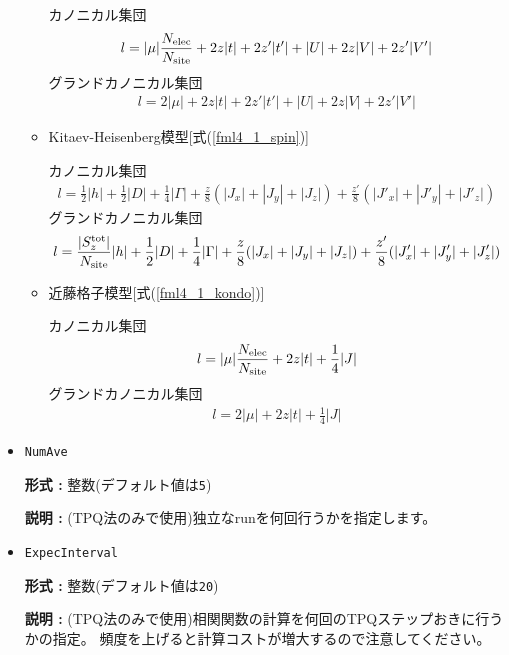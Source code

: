 \begin{itemize}
\begin{itemize}
カノニカル集団
\begin{align}
l = |\mu| \frac{N_{\rm elec}}{N_{\rm site}}
+ 2 z |t| + 2 z' |t'| + |U| + 2 z |V| + 2 z' |V'| 
\end{align}
グランドカノニカル集団
\begin{align}
l = 2|\mu|
+ 2 z |t| + 2 z' |t'| + |U| + 2 z |V| + 2 z' |V'|
\end{align}

\item Kitaev-Heisenberg模型[式(\ref{fml4_1_spin})]

カノニカル集団
\begin{align}
l = \frac{1}{2}|h| + \frac{1}{2}|D| + \frac{1}{4}|\Gamma|
+\frac{z}{8} (|J_x|+|J_y|+|J_z|) +\frac{z'}{8} (|J'_x|+|J'_y|+|J'_z|) 
\end{align}
グランドカノニカル集団
\begin{align}
l = \frac{|S_z^{\rm tot}|}{N_{\rm site}}|h| + \frac{1}{2}|D| + \frac{1}{4}|\Gamma|
+\frac{z}{8} (|J_x|+|J_y|+|J_z|) +\frac{z'}{8} (|J'_x|+|J'_y|+|J'_z|)
\end{align}

\item 近藤格子模型[式(\ref{fml4_1_kondo})]

カノニカル集団
\begin{align}
l = |\mu| \frac{N_{\rm elec}}{N_{\rm site}} + 2 z |t| + \frac{1}{4} |J| 
\end{align}
グランドカノニカル集団
\begin{align}
l = 2|\mu| + 2 z |t| + \frac{1}{4} |J| 
\end{align}

\end{itemize}

\item \verb|NumAve|

{\bf 形式 :} 整数(デフォルト値は\verb|5|)

{\bf 説明 :} (TPQ法のみで使用)独立なrunを何回行うかを指定します。

\item \verb|ExpecInterval|

{\bf 形式 :} 整数(デフォルト値は\verb|20|)

{\bf 説明 :} (TPQ法のみで使用)相関関数の計算を何回のTPQステップおきに行うかの指定。
頻度を上げると計算コストが増大するので注意してください。
\end{itemize}

